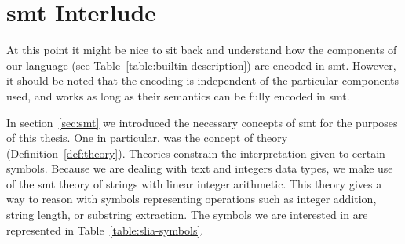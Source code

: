 \section{\gls{smt} Interlude}
\label{sec:smt-interlude}

At this point it might be nice to sit back and understand how the components of
our language (see Table~\ref{table:builtin-description}) are encoded in
\gls{smt}.
However, it should be noted that the encoding is independent of the particular
components used, and works as long as their semantics can be fully encoded in
\gls{smt}.

In section~\ref{sec:smt} we introduced the necessary concepts of \gls{smt} for
the purposes of this thesis.
One in particular, was the concept of theory (Definition~\ref{def:theory}).
Theories constrain the interpretation given to certain symbols.
Because we are dealing with text and integers data types, we make use of the
\gls{smt} theory of strings with linear integer arithmetic.
This theory gives a way to reason with symbols representing operations such as
integer addition, string length, or substring extraction.
The symbols we are interested in are represented in
Table~\ref{table:slia-symbols}.

